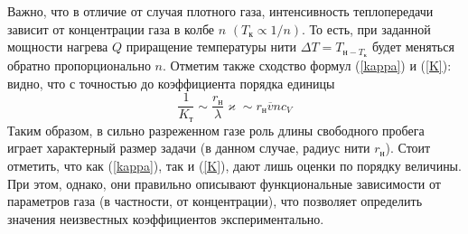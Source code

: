 \documentclass[12pt]{article}
\begin{document}
        Важно, что в отличие от случая плотного газа, интенсивность теплопередачи зависит от концентрации газа в колбе $n$ $(T_{\text{к}} \propto 1/n)$. То есть,
        при заданной мощности нагрева $Q$ приращение температуры нити $\Delta T = T_{\text{н}-T_{\text{к}}}$ будет
        меняться обратно пропорционально $n$. Отметим также сходство формул (\ref{kappa}) и (\ref{K}): видно, что с точностью до коэффициента порядка единицы
        \[
            \frac{1}{K_{\text{т}}} \sim \frac{r_{\text{н}}}{\lambda}\varkappa \sim r_{\text{н}}\overline{v}nc_V
        \]
        Таким образом, в сильно разреженном газе роль длины свободного пробега
        играет характерный размер задачи (в данном случае, радиус нити $r_{\text{н}}$). Стоит отметить, что как (\ref{kappa}), так и (\ref{K}), дают лишь оценки по порядку
        величины. При этом, однако, они правильно описывают функциональные зависимости от параметров газа (в частности, от концентрации), что позволяет
        определить значения неизвестных коэффициентов экспериментально.\\
\end{document}
